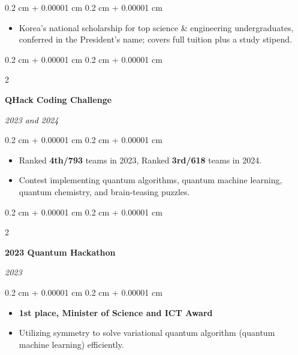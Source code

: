 \documentclass[10pt, letterpaper]{article}
\newenvironment{highlights}{
    \begin{itemize}[
        topsep=0.10 cm,
        parsep=0.10 cm,
        partopsep=0pt,
        itemsep=0pt,
        leftmargin=0.4 cm + 10pt
    ]
}{
    \end{itemize}
} %
\newenvironment{onecolentry}{
    \begin{adjustwidth}{
        0.2 cm + 0.00001 cm
    }{
        0.2 cm + 0.00001 cm
    }
}{
    \end{adjustwidth}
} %
\newenvironment{twocolentry}[2][]{
    \onecolentry
    \def\secondColumn{#2}
    \setcolumnwidth{\fill, 4.5 cm}
    \begin{paracol}{2}
}{
    \switchcolumn \raggedleft \secondColumn
    \end{paracol}
    \endonecolentry
} %
\let\hrefWithoutArrow\href
\renewcommand{\href}[2]{\hrefWithoutArrow{#1}{\ifthenelse{\equal{#2}{}}{ }{#2 }\raisebox{.15ex}{\footnotesize \faExternalLink*}}}
\begin{document}
\vspace{0.10 cm}
\begin{onecolentry}
    \begin{highlights}
        \item Korea's national scholarship for top science \& engineering undergraduates, conferred in the President's name; covers full tuition plus a study stipend.
    \end{highlights}
\end{onecolentry}

\vspace{0.2 cm}

\begin{twocolentry}{
        \textit{2023 and 2024}
    }
    \textbf{QHack Coding Challenge \href{https://qhack.ai}{[link]}}
\end{twocolentry}

\vspace{0.10 cm}
\begin{onecolentry}
    \begin{highlights}
        \item Ranked \textbf{4th/793} teams in 2023, Ranked \textbf{3rd/618} teams in 2024.
        \item Contest implementing quantum algorithms, quantum machine learning, quantum chemistry, and brain-teasing puzzles.
    \end{highlights}
\end{onecolentry}

\vspace{0.2 cm}

\begin{twocolentry}{
        \textit{2023}
    }
    \textbf{2023 Quantum Hackathon \href{https://qhackathon.kr/}{[link]}}
\end{twocolentry}

\vspace{0.10 cm}
\begin{onecolentry}
    \begin{highlights}
        \item \textbf{1st place, Minister of Science and ICT Award}
        \item Utilizing symmetry to solve variational quantum algorithm (quantum machine learning) efficiently.
    \end{highlights}
\end{onecolentry}

\vspace{0.2 cm}
\end{document}
